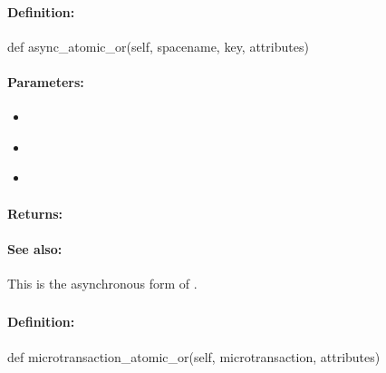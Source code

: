 \paragraph{Definition:}
\begin{pythoncode}
def async_atomic_or(self, spacename, key, attributes)
\end{pythoncode}

\paragraph{Parameters:}
\begin{itemize}[noitemsep]
\item {}\\

\item {}\\

\item {}\\

\end{itemize}

\paragraph{Returns:}


\paragraph{See also:}  This is the asynchronous form of .

\pagebreak
\subsubsection{}
\label{api:python:microtransaction_atomic_or}


\paragraph{Definition:}
\begin{pythoncode}
def microtransaction_atomic_or(self, microtransaction, attributes)
\end{pythoncode}

